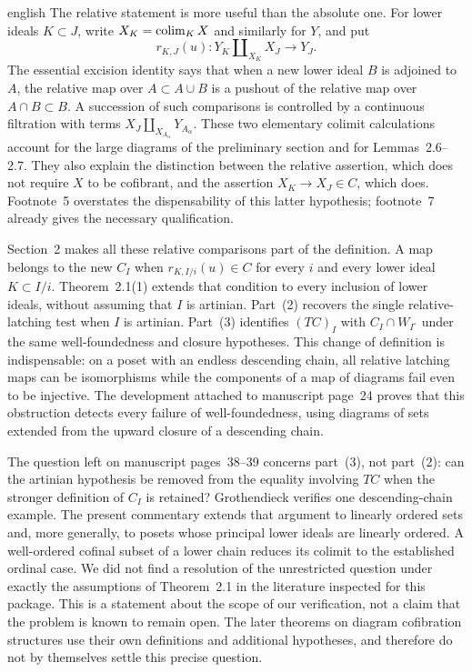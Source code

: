 \begin{otherlanguage*}{english}
The relative statement is more useful than the absolute one. For lower ideals $K\subset J$, write $X_K=\mathop{\rm colim}_{K}X$ and similarly for $Y$, and put
\[
 r_{K,J}(u):Y_K\amalg_{X_K}X_J\longrightarrow Y_J.
\]
The essential excision identity says that when a new lower ideal $B$ is adjoined to $A$, the relative map over $A\subset A\cup B$ is a pushout of the relative map over $A\cap B\subset B$. A succession of such comparisons is controlled by a continuous filtration with terms $X_J\amalg_{X_{A_\alpha}}Y_{A_\alpha}$. These two elementary colimit calculations account for the large diagrams of the preliminary section and for Lemmas~2.6--2.7. They also explain the distinction between the relative assertion, which does not require $X$ to be cofibrant, and the assertion $X_K\to X_J\in C$, which does. Footnote~5 overstates the dispensability of this latter hypothesis; footnote~7 already gives the necessary qualification.

Section~2 makes all these relative comparisons part of the definition. A map belongs to the new $C_I$ when $r_{K,I/i}(u)\in C$ for every $i$ and every lower ideal $K\subset I/i$. Theorem~2.1(1) extends that condition to every inclusion of lower ideals, without assuming that $I$ is artinian. Part~(2) recovers the single relative-latching test when $I$ is artinian. Part~(3) identifies $(TC)_I$ with $C_I\cap W_{I^\circ}$ under the same well-foundedness and closure hypotheses. This change of definition is indispensable: on a poset with an endless descending chain, all relative latching maps can be isomorphisms while the components of a map of diagrams fail even to be injective. The development attached to manuscript page~24 proves that this obstruction detects every failure of well-foundedness, using diagrams of sets extended from the upward closure of a descending chain.

The question left on manuscript pages~38--39 concerns part~(3), not part~(2): can the artinian hypothesis be removed from the equality involving $TC$ when the stronger definition of $C_I$ is retained? Grothendieck verifies one descending-chain example. The present commentary extends that argument to linearly ordered sets and, more generally, to posets whose principal lower ideals are linearly ordered. A well-ordered cofinal subset of a lower chain reduces its colimit to the established ordinal case. We did not find a resolution of the unrestricted question under exactly the assumptions of Theorem~2.1 in the literature inspected for this package. This is a statement about the scope of our verification, not a claim that the problem is known to remain open. The later theorems on diagram cofibration structures use their own definitions and additional hypotheses, and therefore do not by themselves settle this precise question.


\end{otherlanguage*}
